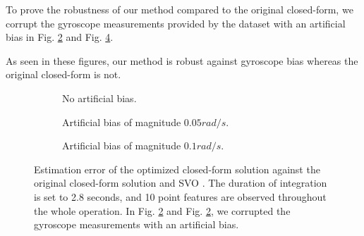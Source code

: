 \documentclass[letterpaper, 10pt, conference, final]{ieeeconf}  %
\begin{document}
To prove the robustness of our method compared to the original closed-form,
we corrupt the gyroscope measurements provided by the dataset with an artificial bias in Fig. \ref{fig:validBias1} and Fig. \ref{fig:validBias2}.

As seen in these figures, our method is robust against gyroscope bias whereas the original closed-form is not.

\begin{figure}
  \centering
  \begin{subfigure}[b]{0.9\columnwidth}
   \resizebox{\columnwidth}{!}{}
    \caption{No artificial bias.\label{fig:valid}}
  \end{subfigure}
  \begin{subfigure}[b]{0.9\columnwidth}
    \resizebox{\columnwidth}{!}{}
    \caption{Artificial bias of magnitude $0.05 rad/s$.\label{fig:validBias1}}
  \end{subfigure}
  \begin{subfigure}[b]{0.9\columnwidth}
    \resizebox{\columnwidth}{!}{}
    \caption{Artificial bias of magnitude $0.1 rad/s$.\label{fig:validBias2}}
  \end{subfigure}
  \caption{Estimation error of the optimized closed-form solution against the original closed-form solution \cite{Martinelli2014} and SVO \cite{FaesslerICRA15}.
    The duration of integration is set to 2.8 seconds, and 10 point features are observed throughout the whole operation.
    In Fig. \ref{fig:validBias1} and Fig. \ref{fig:validBias1}, we corrupted the gyroscope measurements with an artificial bias.}
\end{figure}


\end{document}

